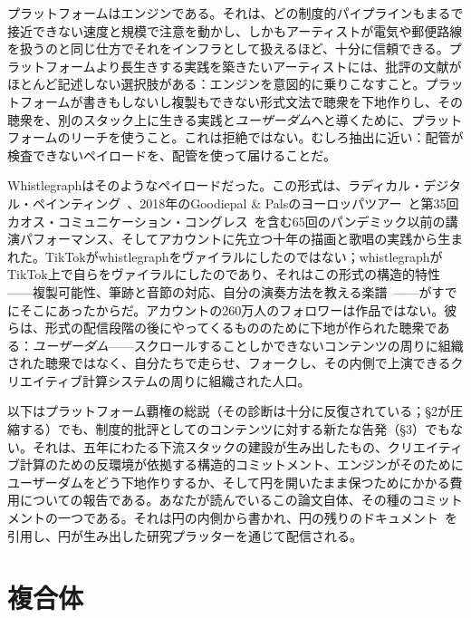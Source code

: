 \documentclass[10pt,letterpaper,twocolumn]{article}
\begin{document}
プラットフォームはエンジンである。それは、どの制度的パイプラインもまるで接近できない速度と規模で注意を動かし、しかもアーティストが電気や郵便路線を扱うのと同じ仕方でそれをインフラとして扱えるほど、十分に信頼できる。プラットフォームより長生きする実践を築きたいアーティストには、批評の文献がほとんど記述しない選択肢がある：エンジンを意図的に乗りこなすこと。プラットフォームが書きもしないし複製もできない形式文法で聴衆を下地作りし、その聴衆を、別のスタック上に生きる実践と\emph{ユーザーダム}へと導くために、プラットフォームのリーチを使うこと。これは拒絶ではない。むしろ抽出に近い：配管が検査できないペイロードを、配管を使って届けることだ。

Whistlegraphはそのようなペイロードだった。この形式は、ラディカル・デジタル・ペインティング~\citep{scudder2017manifesto}、2018年のGoodiepal \& Palsのヨーロッパツアー~\citep{scudder2026goodiepal}と第35回カオス・コミュニケーション・コングレス~\citep{scudder2018rdp35c3}を含む65回のパンデミック以前の講演パフォーマンス、そしてアカウントに先立つ十年の描画と歌唱の実践から生まれた。TikTokがwhistlegraphをヴァイラルにしたのではない；whistlegraphがTikTok上で自らをヴァイラルにしたのであり、それはこの形式の構造的特性——複製可能性、筆跡と音節の対応、自分の演奏方法を教える楽譜~\citep{scudder2026whistlegraph}——がすでにそこにあったからだ。アカウントの260万人のフォロワーは作品ではない。彼らは、形式の配信段階の後にやってくるもののために下地が作られた聴衆である：\emph{ユーザーダム}——スクロールすることしかできないコンテンツの周りに組織された聴衆ではなく、自分たちで走らせ、フォークし、その内側で上演できるクリエイティブ計算システムの周りに組織された人口。

以下はプラットフォーム覇権の総説（その診断は十分に反復されている；\S2が圧縮する）でも、制度的批評としてのコンテンツに対する新たな告発（\S3）でもない。それは、五年にわたる下流スタックの建設が生み出したもの、クリエイティブ計算のための反環境が依拠する構造的コミットメント、エンジンがそのためにユーザーダムをどう下地作りするか、そして円を開いたまま保つためにかかる費用についての報告である。あなたが読んでいるこの論文自体、その種のコミットメントの一つである。それは円の内側から書かれ、円の残りのドキュメント~\citep{scudder2026ac, scudder2026kidlisp, scudder2026notepat, scudder2026os, scudder2026pieces, scudder2026urltradition, scudder2026archaeology, scudder2026whistlegraph, scudder2026goodiepal}を引用し、円が生み出した研究プラッターを通じて配信される。

\section{複合体}
\end{document}
